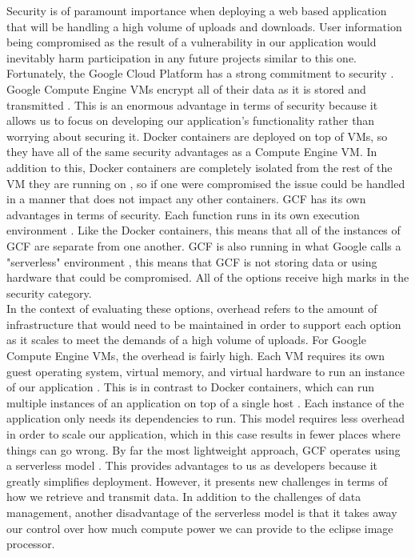 \documentclass[10pt, onecolumn, draftclsnofoot, letterpaper, compsoc]{IEEEtran}
\begin{document}
Security is of paramount importance when deploying a web based application that
will be handling a high volume of uploads and downloads.
User information being compromised as the result of a vulnerability in our
application would inevitably harm participation in any future projects similar
to this one. Fortunately, the Google Cloud Platform has a strong commitment to
security \cite{gcp}. Google Compute Engine VMs encrypt all of their data as it
is stored and transmitted \cite{gcp}. This is an enormous advantage in terms of
security because it allows us to focus on developing our application's
functionality rather than worrying about securing it. Docker containers are
deployed on top of VMs, so they have all of the same security advantages as a
Compute Engine VM. In addition to this, Docker containers are completely
isolated from the rest of the VM they are running on \cite{docker}, so if one
were compromised the issue could be handled in a manner that does not impact any
other containers. GCF has its own advantages in terms of security. Each function
runs in its own execution environment \cite{docker}. Like the Docker containers,
this means that all of the instances of GCF are separate from one another. GCF
is also running in what Google calls a "serverless" environment \cite{docker},
this means that GCF is not storing data or using hardware that could be
compromised. All of the options receive high marks in the security category. \\

In the context of evaluating these options, overhead refers to the amount of
infrastructure that would need to be maintained in order to support each option
as it scales to meet the demands of a high volume of uploads. For Google Compute
Engine VMs, the overhead is fairly high. Each VM requires its own guest
operating system, virtual memory, and virtual hardware to run an instance of our
application \cite{docker, gcp}. This is in contrast to Docker containers, which
can run multiple instances of an application on top of a single host
\cite{docker}. Each instance of the application only needs its dependencies to
run. This model requires less overhead in order to scale our application, which
in this case results in fewer places where things can go wrong. By far the most
lightweight approach, GCF operates using a serverless model \cite{gcp}. This
provides advantages to us as developers because it greatly simplifies
deployment. However, it presents new challenges in terms of how we retrieve and
transmit data. In addition to the challenges of data management, another
disadvantage of the serverless model is that it takes away our control over how
much compute power we can provide to the eclipse image processor. \\
\end{document}
